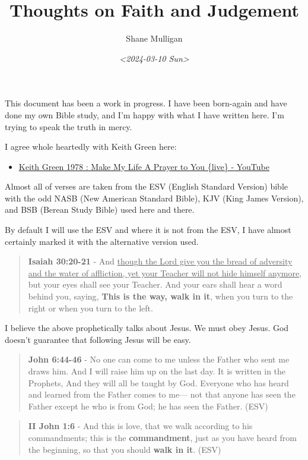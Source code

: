 \documentclass[11pt]{article}
\author{Shane Mulligan}
\date{\textit{<2024-03-10 Sun>}}
\title{Thoughts on Faith and Judgement}
\begin{document}
\maketitle
This document has been a work in progress. I have been born-again and have done my own Bible study, and I'm happy with what I have written here.
I'm trying to speak the truth in mercy.

I agree whole heartedly with Keith Green here:
\begin{itemize}
\item \href{https://www.youtube.com/watch?v=z7oCa9BvO9g}{Keith Green 1978 : Make My Life A Prayer to You \{live\} - YouTube}
\end{itemize}

Almost all of verses are taken from the ESV
(English Standard Version) bible with the odd NASB
(New American Standard Bible), KJV (King
James Version), and BSB (Berean Study Bible) used here and there.

By default I will use the ESV and where it is
not from the ESV, I have almost certainly marked it with the alternative version used.

\begin{quote}
\textbf{Isaiah 30:20-21} - And \uline{though the Lord give you the bread of adversity and the water of affliction, yet your Teacher will not hide himself anymore}, but your eyes shall see your Teacher. And your ears shall hear a word behind you, saying, \textbf{This is the way, walk in it}, when you turn to the right or when you turn to the left.
\end{quote}

I believe the above prophetically talks about Jesus. We must obey Jesus. God doesn't guarantee that following Jesus will be easy.

\begin{quote}
\textbf{John 6:44-46} - No one can come to me unless the Father who sent me draws him. And I will raise him up on the last day. It is written in the Prophets, And they will all be taught by God. Everyone who has heard and learned from the Father comes to me— not that anyone has seen the Father except he who is from God; he has seen the Father. (ESV)
\end{quote}

\begin{quote}
\textbf{II John 1:6} - And this is love, that we walk according to his commandments; this is the \textbf{commandment}, just as you have heard from the beginning, so that you should \textbf{walk in it}. (ESV)
\end{quote}
\end{document}
